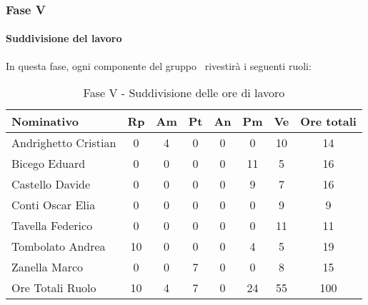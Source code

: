 \documentclass[../PianoProgetto.tex]{subfiles}
\begin{document}
	\subsubsection{Fase V}
				\paragraph{Suddivisione del lavoro}
					In questa fase, ogni componente del gruppo \leaf\ rivestirà i seguenti ruoli:
	
					\begin{table}[h]
		\centering
	
		\begin{tabular}{l * {7}{c}}
			\toprule
			Nominativo & Rp & Am & Pt & An & Pm & Ve & Ore totali \\
			\midrule
			Andrighetto Cristian & 0 & 4 & 0 & 0 & 0 & 10 & 14 \\
			\midrule
			Bicego Eduard & 0 & 0 &	0 &	0 &	11 & 5 & 16 \\
			\midrule
			Castello Davide & 0 & 0 & 0 & 0 & 9 & 7 & 16 \\
			\midrule
			Conti Oscar Elia &0 & 0 & 0 & 0 & 0 & 9 & 9 \\
			\midrule
			Tavella Federico &	0 & 0 & 0 & 0 & 0 & 11 & 11 \\
			\midrule
			Tombolato Andrea & 10 & 0 & 0 & 0 & 4 & 5 & 19 \\
			\midrule
			Zanella Marco & 0 & 0 & 7 & 0 & 0 & 8 & 15 \\
			\midrule			
			Ore Totali Ruolo & 10 & 4 &	7 &	0 &	24 & 55 & 100 \\
			\bottomrule
			
		\end{tabular}
		
		\caption{Fase V - Suddivisione delle ore di lavoro}
		\label{tab:faseV_ore}
		
	\end{table}
	
\end{document}
